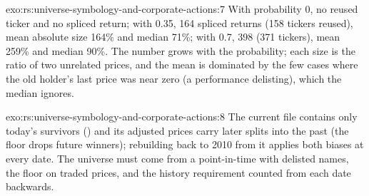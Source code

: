 \begin{solution}{exo:rs:universe-symbology-and-corporate-actions:7}
With probability 0, no reused ticker and no spliced return; with 0.35, 164 spliced returns (158 tickers reused), mean absolute size
164\% and median 71\%; with 0.7, 398 (371 tickers), mean 259\% and median 90\%. The number grows with the probability; each size is the
ratio of two unrelated prices, and the mean is dominated by the few cases where the old holder's last price was near zero (a
performance delisting), which the median ignores.
\end{solution}

\begin{solution}{exo:rs:universe-symbology-and-corporate-actions:8}
The current file contains only today's survivors () and its adjusted prices carry later splits into the past (the
floor drops future winners); rebuilding back to 2010 from it applies both biases at every date. The universe must come from a
point-in-time  with delisted names, the floor on traded prices, and the history requirement counted from each date
backwards.
\end{solution}

